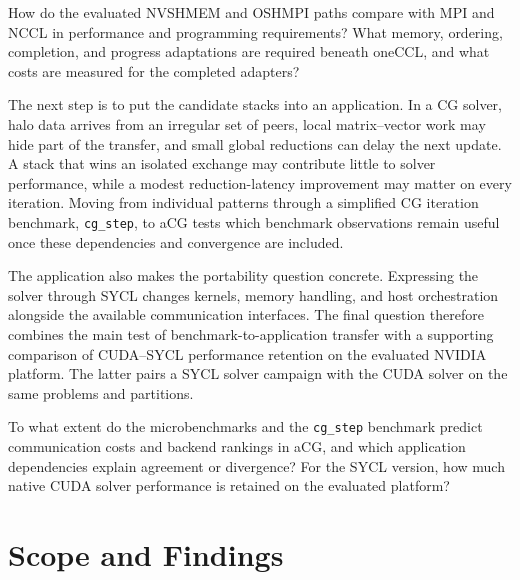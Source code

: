 \begin{researchquestion}
How do the evaluated NVSHMEM and OSHMPI paths compare with MPI and NCCL in performance and programming requirements? What memory, ordering, completion, and progress adaptations are required beneath oneCCL, and what costs are measured for the completed adapters?
\end{researchquestion}

The next step is to put the candidate stacks into an application. In a CG solver, halo data arrives from an irregular set of peers, local matrix--vector work may hide part of the transfer, and small global reductions can delay the next update. A stack that wins an isolated exchange may contribute little to solver performance, while a modest reduction-latency improvement may matter on every iteration. Moving from individual patterns through a simplified CG iteration benchmark, \texttt{cg\_step}, to aCG tests which benchmark observations remain useful once these dependencies and convergence are included.

The application also makes the portability question concrete. Expressing the solver through SYCL changes kernels, memory handling, and host orchestration alongside the available communication interfaces. The final question therefore combines the main test of benchmark-to-application transfer with a supporting comparison of CUDA--SYCL performance retention on the evaluated NVIDIA platform. The latter pairs a SYCL solver campaign with the CUDA solver on the same problems and partitions.

\begin{researchquestion}
To what extent do the microbenchmarks and the \texttt{cg\_step} benchmark predict communication costs and backend rankings in aCG, and which application dependencies explain agreement or divergence? For the SYCL version, how much native CUDA solver performance is retained on the evaluated platform?
\end{researchquestion}

\section{Scope and Findings}


